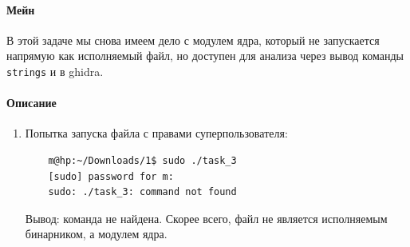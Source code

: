 \paragraph{Мейн}
В этой задаче мы снова имеем дело с модулем ядра, который не запускается напрямую как исполняемый файл, но доступен для анализа через вывод команды \texttt{strings} и в ghidra.

\paragraph{Описание}
\begin{enumerate}
    \item Попытка запуска файла с правами суперпользователя:
    \begin{verbatim}
    m@hp:~/Downloads/1$ sudo ./task_3
    [sudo] password for m:
    sudo: ./task_3: command not found
    \end{verbatim}
    Вывод: команда не найдена. Скорее всего, файл не является исполняемым бинарником, а модулем ядра.


\end{enumerate}
